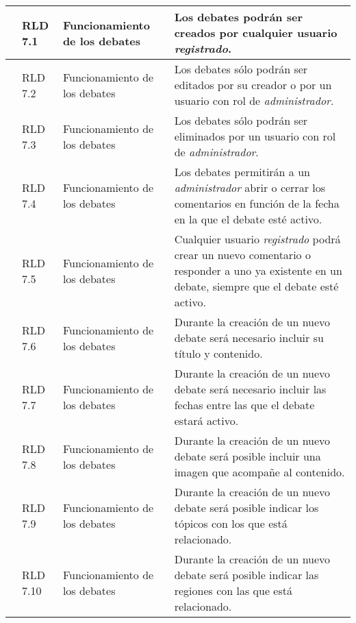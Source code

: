 \begin{longtable}[c]{|p{1mm}|p{14mm}|p{30mm}|p{90mm}|}
\hline
& RLD 7.1 & Funcionamiento de los debates & Los debates podrán ser creados por cualquier usuario \textit{registrado}. \\
\hline
& RLD 7.2 & Funcionamiento de los debates & Los debates sólo podrán ser editados por su creador o por un usuario con rol de \textit{administrador}. \\
\hline
& RLD 7.3 & Funcionamiento de los debates & Los debates sólo podrán ser eliminados por un usuario con rol de \textit{administrador}. \\
\hline
& RLD 7.4 & Funcionamiento de los debates & Los debates permitirán a un \textit{administrador} abrir o cerrar los comentarios en función de la fecha en la que el debate esté activo. \\
\hline
& RLD 7.5 & Funcionamiento de los debates & Cualquier usuario \textit{registrado} podrá crear un nuevo comentario o responder a uno ya existente en un debate, siempre que el debate esté activo. \\
\hline
& RLD 7.6 & Funcionamiento de los debates & Durante la creación de un nuevo debate será necesario incluir su título y contenido. \\
\hline
& RLD 7.7 & Funcionamiento de los debates & Durante la creación de un nuevo debate será necesario incluir las fechas entre las que el debate estará activo. \\
\hline
& RLD 7.8 & Funcionamiento de los debates & Durante la creación de un nuevo debate será posible incluir una imagen que acompañe al contenido. \\
\hline
& RLD 7.9 & Funcionamiento de los debates & Durante la creación de un nuevo debate será posible indicar los tópicos con los que está relacionado. \\
\hline
& RLD 7.10 & Funcionamiento de los debates & Durante la creación de un nuevo debate será posible indicar las regiones con las que está relacionado. \\
\hline
\hline

 \end{longtable}
 
 
 
 
 
 
 
 
 
 
 
 
 
 
 
 
 
 
 
 
 